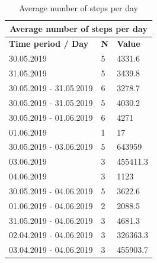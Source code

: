 \begin{table}[]
\begin{tabular}{|l|l|l|}
\hline
\multicolumn{3}{|c|}{\textbf{Average number of steps per day}}     \\ \hline
\textbf{Time period / Day} & \textbf{N} & \textbf{Value}           \\ \hline
30.05.2019                 & 5          & 4331.6                   \\ \hline
31.05.2019                 & 5          & 3439.8                   \\ \hline
30.05.2019 - 31.05.2019    & 6          & 3278.7                   \\ \hline
30.05.2019 - 31.05.2019    & 5          & 4030.2                   \\ \hline
30.05.2019 - 01.06.2019    & 6          & 4271                     \\ \hline
01.06.2019                 & 1          & 17                       \\ \hline
30.05.2019 - 03.06.2019    & 5          & 643959                   \\ \hline
03.06.2019                 & 3          & 455411.3                 \\ \hline
04.06.2019                 & 3          & 1123                     \\ \hline
30.05.2019 - 04.06.2019    & 5          & 3622.6                   \\ \hline
01.06.2019 - 04.06.2019    & 2          & 2088.5                   \\ \hline
31.05.2019 - 04.06.2019    & 3          & 4681.3                   \\ \hline
02.04.2019 - 04.06.2019    & 3          & 326363.3                 \\ \hline
03.04.2019 - 04.06.2019    & 3          & 455903.7                 \\ \hline
\end{tabular}
\label{results-steps}
\caption{Average number of steps per day}
\end{table}


